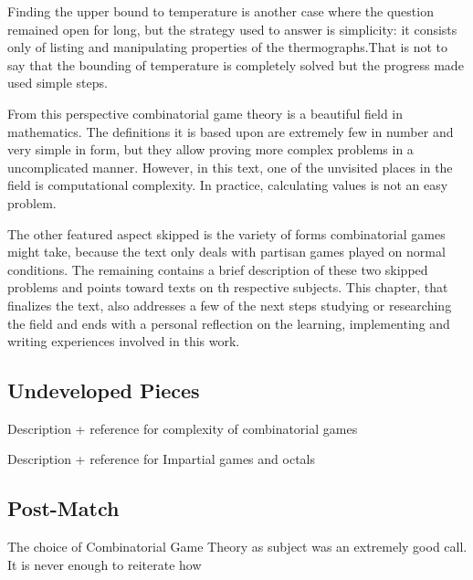 Finding the upper bound to temperature is another case where the question remained open for long, but the strategy used to answer is simplicity: it consists only of listing and manipulating properties of the thermographs.That is not to say that the bounding of temperature is completely solved but the progress made used simple steps.

From this perspective combinatorial game theory is a beautiful field in mathematics. The definitions it is based upon are extremely few in number and very simple in form, but they allow proving more complex problems in a uncomplicated manner. However, in this text, one of the unvisited places in the field is computational complexity. In practice, calculating values is not an easy problem.

The other featured aspect skipped is the variety of forms combinatorial games might take, because the text only deals with partisan games played on normal conditions. The remaining contains a brief description of these two skipped problems and points toward texts on th respective subjects. This chapter, that finalizes the text, also addresses a few of the next steps studying or researching the field and ends with a personal reflection on the learning, implementing and writing experiences involved in this work.


\subsection*{Undeveloped Pieces}

Description + reference for complexity of combinatorial games

Description + reference for Impartial games and octals

\subsection*{Post-Match}

The choice of Combinatorial Game Theory as subject was an extremely good call. It is never enough to reiterate how  

%
%













